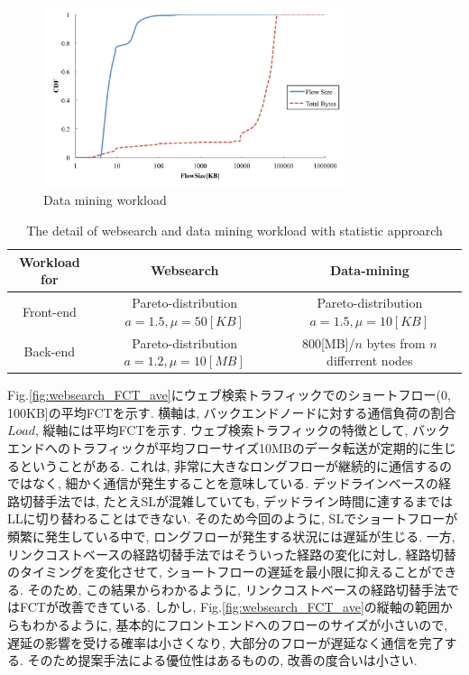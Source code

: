 \begin{figure}[t]
    \begin{center}
    \includegraphics[autoebb, width=250pt]{./img/datamining.pdf}
    \caption{Data mining workload}
    \label{fig:datamining}
    \end{center}
\end{figure}

\begin{table}[t]
    \begin{center}
    \caption{The detail of websearch and data mining workload with statistic
    approarch}
    \begin{tabular}{c||c|c}
    \hline
    Workload for & Websearch & Data-mining \\ \hline
    Front-end & \shortstack{Pareto-distribution \\ $a=1.5, \mu=50[KB]$} &
    \shortstack{Pareto-distribution \\ $a=1.5, \mu=10[KB]$} \\ \hline
    Back-end & \shortstack{Pareto-distribution \\ $a=1.2, \mu=10[MB]$} & 
    \shortstack{800[MB]/$n$ bytes \\ from $n$ differrent nodes}
    \end{tabular}
    \label{table:workload}
    \end{center}
\end{table}

Fig.\ref{fig:websearch_FCT_ave}にウェブ検索トラフィックでのショートフロー(0, 100KB]の平均FCTを示す. 
横軸は, バックエンドノードに対する通信負荷の割合$Load$, 縦軸には平均FCTを示す. 
ウェブ検索トラフィックの特徴として, バックエンドへのトラフィックが平均フローサイズ10MBのデータ転送が定期的に生じるということがある. 
これは, 非常に大きなロングフローが継続的に通信するのではなく, 細かく通信が発生することを意味している. 
デッドラインベースの経路切替手法では, たとえSLが混雑していても, デッドライン時間に達するまではLLに切り替わることはできない. 
そのため今回のように, SLでショートフローが頻繁に発生している中で, ロングフローが発生する状況には遅延が生じる. 
一方, リンクコストベースの経路切替手法ではそういった経路の変化に対し, 経路切替のタイミングを変化させて, ショートフローの遅延を最小限に抑えることができる. 
そのため, この結果からわかるように, リンクコストベースの経路切替手法ではFCTが改善できている. 
しかし, Fig.\ref{fig:websearch_FCT_ave}の縦軸の範囲からもわかるように, 基本的にフロントエンドへのフローのサイズが小さいので,
遅延の影響を受ける確率は小さくなり, 大部分のフローが遅延なく通信を完了する. 
そのため提案手法による優位性はあるものの, 改善の度合いは小さい. 

